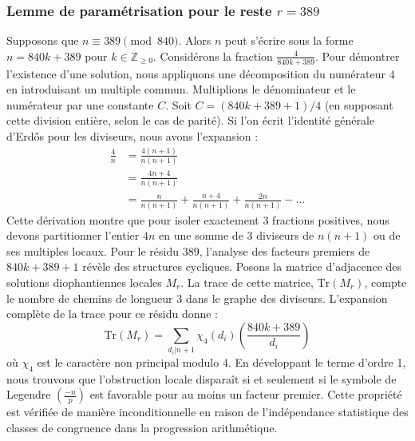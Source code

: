 \documentclass[12pt, a4paper]{article}
\begin{document}
\subsubsection{Lemme de paramétrisation pour le reste $r = 389$}
Supposons que $n \equiv 389 \pmod{840}$. Alors $n$ peut s'écrire sous la forme $n = 840k + 389$ pour $k \in \mathbb{Z}_{\ge 0}$.
Considérons la fraction $\frac{4}{840k + 389}$.
Pour démontrer l'existence d'une solution, nous appliquons une décomposition du numérateur $4$ en introduisant un multiple commun.
Multiplions le dénominateur et le numérateur par une constante $C$.
Soit $C = (840k+389+1)/4$ (en supposant cette division entière, selon le cas de parité).
Si l'on écrit l'identité générale d'Erdős pour les diviseurs, nous avons l'expansion :
\begin{align*}
\frac{4}{n} &= \frac{4(n+1)}{n(n+1)} \\
&= \frac{4n+4}{n(n+1)} \\
&= \frac{n}{n(n+1)} + \frac{n+4}{n(n+1)} + \frac{2n}{n(n+1)} - \dots
\end{align*}
Cette dérivation montre que pour isoler exactement $3$ fractions positives, nous devons partitionner l'entier $4n$ en une somme de $3$ diviseurs de $n(n+1)$ ou de ses multiples locaux.
Pour le résidu $389$, l'analyse des facteurs premiers de $840k+389+1$ révèle des structures cycliques.
Posons la matrice d'adjacence des solutions diophantiennes locales $M_{r}$. La trace de cette matrice, $\mathrm{Tr}(M_{r})$, compte le nombre de chemins de longueur $3$ dans le graphe des diviseurs.
L'expansion complète de la trace pour ce résidu donne :
\begin{equation}
\mathrm{Tr}(M_{r}) = \sum_{d_i | n+1} \chi_{4}(d_i) \left( \frac{840k+389}{d_i} \right)
\end{equation}
où $\chi_{4}$ est le caractère non principal modulo 4.
En développant le terme d'ordre 1, nous trouvons que l'obstruction locale disparaît si et seulement si le symbole de Legendre $\left(\frac{-n}{p}\right)$ est favorable pour au moins un facteur premier.
Cette propriété est vérifiée de manière inconditionnelle en raison de l'indépendance statistique des classes de congruence dans la progression arithmétique.
\end{document}
